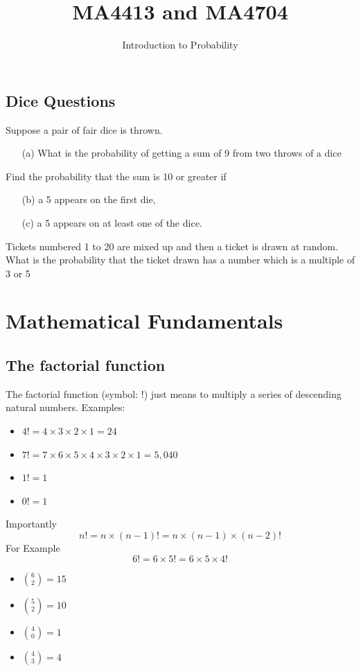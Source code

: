 \documentclass[12pt]{report}
\title{MA4413 and MA4704}
\author{Introduction to Probability}
\begin{document}
\LARGE
\section{Dice Questions}

		Suppose a pair of fair dice is thrown. 
		\begin{itemize}
			\item[(a)] What is the probability of getting a sum of 9 from two throws of a dice
		\end{itemize}
		Find the probability that the sum is 10 or greater if
		\begin{itemize}
			\item[(b)] a 5 appears on the first die, 
			\item[(c)] a 5 appears on at least one of the dice.
		\end{itemize}
		
		
		
	Tickets numbered 1 to 20 are mixed up and then a ticket is drawn at random. What is the probability that the ticket drawn has a number which is a multiple of 3 or 5

\chapter{Mathematical Fundamentals}
\section*{The factorial function}
The factorial function (symbol: !) just means to multiply a series of descending natural numbers. Examples:

\begin{itemize}
	\item $4! = 4 \times 3 \times 2 \times 1 = 24$
	\item $7! = 7 \times 6 \times 5 \times 4 \times 3 \times 2 \times 1 = 5,040$
	\item $1! = 1$
	\item $0! = 1 $
\end{itemize}
Importantly 
\[n! = n \times (n-1)!  = n \times (n-1) \times (n-2)! \]
For Example
\[6! = 6 \times 5!  = 6 \times 5 \times 4! \]

		\begin{itemize}
			\item ${6 \choose 2} = 15$
			\item ${5 \choose 2} = 10$  
			\item ${4 \choose 0} = 1$  
			\item ${4 \choose 3} = 4$  
		\end{itemize}
		
\end{document}
